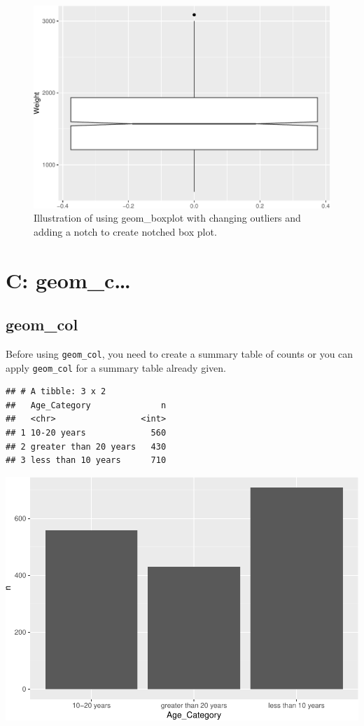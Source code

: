 \documentclass[
]{book}
\begin{document}
\begin{figure}
\centering
\includegraphics{Data-Visualisation-geom-Encyclopedia_files/figure-latex/unnamed-chunk-27-1.pdf}
\caption{\label{fig:unnamed-chunk-27}Illustration of using geom\_boxplot with changing outliers and adding a notch to create notched box plot.}
\end{figure}

\hypertarget{c-geom_c}{%
\chapter{C: geom\_c\ldots{}}\label{c-geom_c}}

\hypertarget{geom_col}{%
\section{geom\_col}\label{geom_col}}

Before using \texttt{geom\_col}, you need to create a summary table of counts or you can apply \texttt{geom\_col} for a summary table already given.

\begin{verbatim}
## # A tibble: 3 x 2
##   Age_Category              n
##   <chr>                 <int>
## 1 10-20 years             560
## 2 greater than 20 years   430
## 3 less than 10 years      710
\end{verbatim}

\includegraphics{Data-Visualisation-geom-Encyclopedia_files/figure-latex/unnamed-chunk-29-1.pdf}
\end{document}
